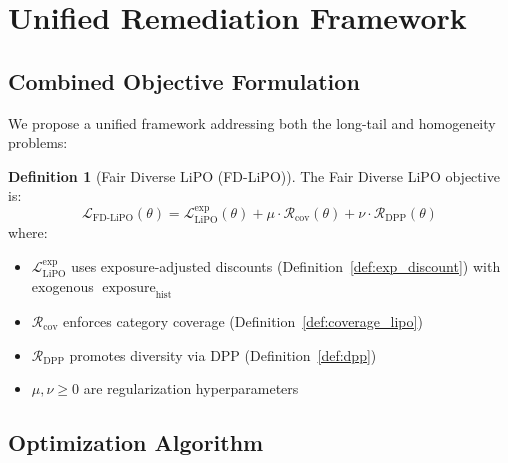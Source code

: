 \documentclass[11pt,a4paper]{article}
\theoremstyle{definition}
\newtheorem{definition}{Definition}[section]
\theoremstyle{plain}
\theoremstyle{remark}
\DeclareMathOperator{\exposure}{exposure}
\begin{document}
\section{Unified Remediation Framework}
\label{sec:unified}

\subsection{Combined Objective Formulation}
\label{subsec:combined}

We propose a unified framework addressing both the long-tail and homogeneity problems:

\begin{definition}[Fair Diverse LiPO (FD-LiPO)]
\label{def:fd_lipo}
The Fair Diverse LiPO objective is:
\begin{equation}
\boxed{
    \mathcal{L}_{\text{FD-LiPO}}(\theta) = \mathcal{L}_{\text{LiPO}}^{\text{exp}}(\theta) + \mu \cdot \mathcal{R}_{\text{cov}}(\theta) + \nu \cdot \mathcal{R}_{\text{DPP}}(\theta)
}
\end{equation}
where:
\begin{itemize}
    \item $\mathcal{L}_{\text{LiPO}}^{\text{exp}}$ uses exposure-adjusted discounts (Definition~\ref{def:exp_discount}) with exogenous $\exposure_{\text{hist}}$
    \item $\mathcal{R}_{\text{cov}}$ enforces category coverage (Definition~\ref{def:coverage_lipo})
    \item $\mathcal{R}_{\text{DPP}}$ promotes diversity via DPP (Definition~\ref{def:dpp})
    \item $\mu, \nu \geq 0$ are regularization hyperparameters
\end{itemize}
\end{definition}

\subsection{Optimization Algorithm}
\label{subsec:algorithm}
\end{document}
